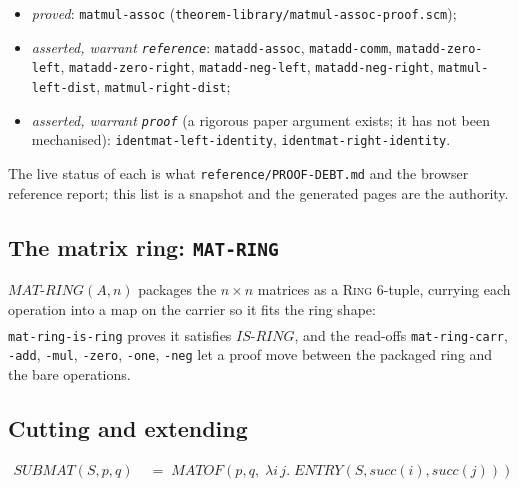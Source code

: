 \begin{itemize}
\item \emph{proved}: \texttt{matmul-assoc}
      (\texttt{theorem-library/matmul-assoc-proof.scm});
\item \emph{asserted, warrant \texttt{reference}}: \texttt{matadd-assoc},
      \texttt{matadd-comm}, \texttt{matadd-zero-left},
      \texttt{matadd-zero-right}, \texttt{matadd-neg-left},
      \texttt{matadd-neg-right}, \texttt{matmul-left-dist},
      \texttt{matmul-right-dist};
\item \emph{asserted, warrant \texttt{proof}} (a rigorous paper argument
      exists; it has not been mechanised):
      \texttt{identmat-left-identity}, \texttt{identmat-right-identity}.
\end{itemize}

\noindent
The live status of each is what \texttt{reference/PROOF-DEBT.md} and the
browser reference report; this list is a snapshot and the generated
pages are the authority.

\subsection{The matrix ring: \texttt{MAT-RING}}

$\mathit{MAT\text{-}RING}(A, n)$ packages the $n \times n$ matrices as a
\textsc{Ring} 6-tuple, currying each operation into a map on the carrier
so it fits the ring shape:
\begin{align*}
  [\;&\mathit{MAT}(n,n,\mathit{CARR}(A)),\;
     \lambda P\,Q.\,\mathit{MATADD}(A,P,Q),\;
     \lambda P\,Q.\,\mathit{MATMUL}(A,P,Q),\\
    &\lambda P.\,\mathit{MATNEG}(A,P),\;
     \mathit{ZEROMAT}(A,n,n),\;
     \mathit{IDENTMAT}(A,n)\;]
\end{align*}
\texttt{mat-ring-is-ring} proves it satisfies $\mathit{IS\text{-}RING}$,
and the read-offs \texttt{mat-ring-carr}, \texttt{-add}, \texttt{-mul},
\texttt{-zero}, \texttt{-one}, \texttt{-neg} let a proof move between
the packaged ring and the bare operations.

\subsection{Cutting and extending}

\begin{align*}
\mathit{SUBMAT}(S, p, q) &\;=\;
  \mathit{MATOF}(p, q,\; \lambda i\, j.\;
    \mathit{ENTRY}(S, \mathit{succ}(i), \mathit{succ}(j)))
\end{align*}

